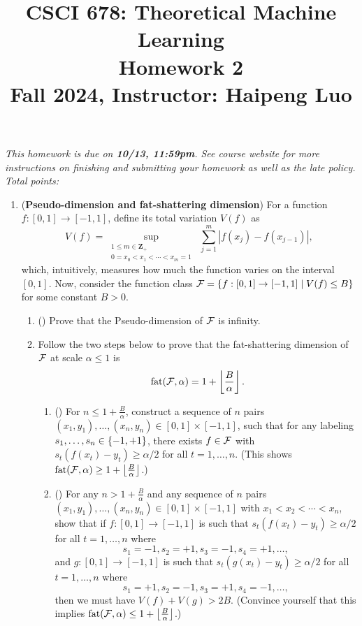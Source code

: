 \documentclass{article}
\title{CSCI 678: Theoretical Machine Learning \\ Homework 2 \\ {\small Fall 2024, Instructor: Haipeng Luo}}
\begin{document}
\maketitle

\textit{This homework is due on {\bf 10/13, 11:59pm}. 
See course website for more instructions on finishing and submitting your homework as well as the late policy. Total points: }\\

\begin{enumerate}[leftmargin=*,align=left]
\item 
({\bf Pseudo-dimension and fat-shattering dimension})
For a function $f: [0,1] \rightarrow [-1,1]$, define its total variation $V(f)$ as 
\[
V(f) = \sup_{\substack{1 \leq m \in \mathbf{Z}_+ \\ 0= x_0 < x_1 < \cdots < x_m=1}}\;\sum_{j=1}^m |f(x_j) - f(x_{j-1})|,
\]
which, intuitively, measures how much the function varies on the interval $[0,1]$.
Now, consider the function class ${\mathcal{F}}=\left\{f: [0,1] \rightarrow [-1,1] \;|\; V(f) \leq B\right\}$ for some constant $B > 0$.

\begin{enumerate}[leftmargin=*,align=left]
\item ()  Prove that the Pseudo-dimension of ${\mathcal{F}}$ is infinity. \\


\newpage
\item Follow the two steps below to prove that the fat-shattering dimension of ${\mathcal{F}}$ at scale $\alpha \leq 1$ is
\[
{\text{\rm fat}}({\mathcal{F}}, \alpha) = 1 + \left\lfloor \frac{B}{\alpha} \right\rfloor.
\]

\begin{enumerate}[leftmargin=*,align=left]
\item ()  For $n \leq 1 + \frac{B}{\alpha}$, construct a sequence of $n$ pairs $(x_1, y_1), \ldots, (x_n, y_n) \in [0,1] \times [-1,1]$, such that for any labeling $s_1, \ldots, s_n \in \left\{-1,+1\right\}$, there exists $f\in{\mathcal{F}}$ with $s_t(f(x_t) - y_t) \geq \alpha/2$ for all $t = 1, \ldots, n$. (This shows ${\text{\rm fat}}({\mathcal{F}}, \alpha) \geq 1 + \left\lfloor \frac{B}{\alpha} \right\rfloor$.)\\


\vspace{5pt}
\item ()  For any $n > 1 + \frac{B}{\alpha}$ and any sequence of $n$ pairs $(x_1, y_1), \ldots, (x_n, y_n) \in [0,1] \times [-1,1]$ with $x_1 < x_2 < \cdots < x_n$, show that if $f: [0,1]\rightarrow [-1,1]$ is such that $s_t(f(x_t) - y_t) \geq \alpha/2$ for all $t = 1, \ldots, n$ where
\[
s_1 = -1, s_2 = +1, s_3 = -1, s_4=+1, \ldots,
\]
and $g: [0,1]\rightarrow [-1,1]$ is such that $s_t(g(x_t) - y_t) \geq \alpha/2$ for all $t = 1, \ldots, n$ where
\[
s_1 = +1, s_2 = -1, s_3 = +1, s_4=-1, \ldots,
\]
then we must have $V(f)+V(g) > 2B$. 
(Convince yourself that this implies ${\text{\rm fat}}({\mathcal{F}}, \alpha) \leq 1 + \left\lfloor \frac{B}{\alpha} \right\rfloor$.)\\


\end{enumerate}
\end{enumerate}
\end{enumerate}
\end{document}
